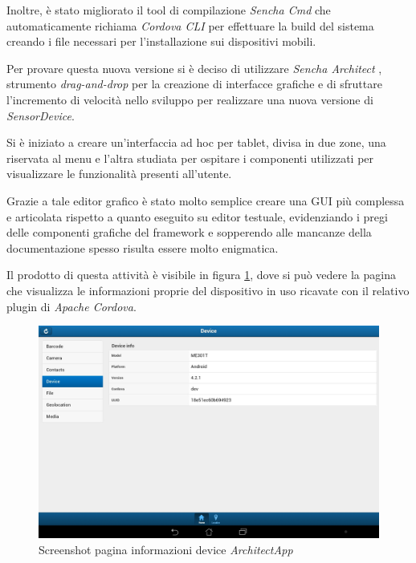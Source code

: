 Inoltre, è stato migliorato il tool di compilazione \emph{Sencha Cmd} che automaticamente richiama \emph{Cordova \ac{CLI}} per effettuare la build del sistema creando i file necessari per l'installazione sui dispositivi mobili.

Per provare questa nuova versione si è deciso di utilizzare \emph{Sencha Architect} \cite{sencha:architect}, strumento \emph{drag-and-drop} per la creazione di interfacce grafiche e di sfruttare l'incremento di velocità nello sviluppo per realizzare una nuova versione di \emph{SensorDevice}.

Si è iniziato a creare un'interfaccia ad hoc per tablet, divisa in due zone, una riservata al menu e l'altra studiata per ospitare i componenti utilizzati per visualizzare le funzionalità presenti all'utente.

Grazie a tale editor grafico è stato molto semplice creare una \ac{GUI} più complessa e articolata rispetto a quanto eseguito su editor testuale, evidenziando i pregi delle componenti grafiche del framework e sopperendo alle mancanze della documentazione spesso risulta essere molto enigmatica.

Il prodotto di questa attività è visibile in figura \ref{fig:screenshot device architect}, dove si può vedere la pagina che visualizza le informazioni proprie del dispositivo in uso ricavate con il relativo plugin di \emph{Apache Cordova}.

\begin{figure}[htb]
\centering
\includegraphics[scale=0.25]{gfx/screenshot/screen_device_architect}
\caption{Screenshot pagina informazioni device \emph{ArchitectApp}}
\label{fig:screenshot device architect}
\end{figure}